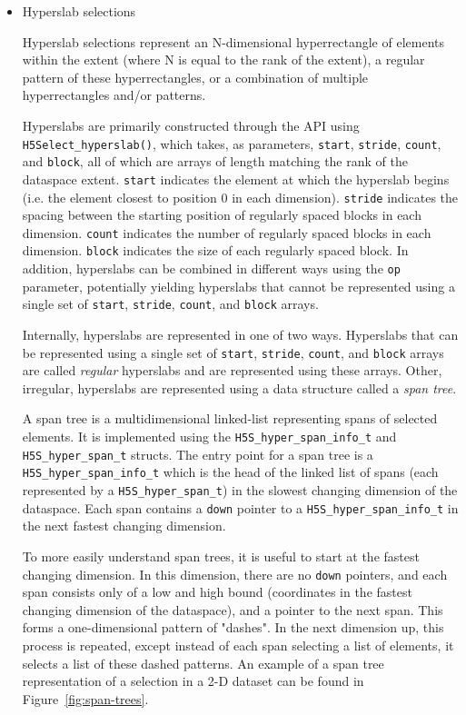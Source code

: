 \begin{itemize}
    \item Hyperslab selections

Hyperslab selections represent an N-dimensional hyperrectangle of elements within the extent (where N is equal to the rank of the extent), a regular pattern of these hyperrectangles, or a combination of multiple hyperrectangles and/or patterns.

Hyperslabs are primarily constructed through the API using \texttt{H5Select\_hyperslab()}, which takes, as parameters, \texttt{start}, \texttt{stride}, \texttt{count}, and \texttt{block}, all of which are arrays of length matching the rank of the dataspace extent. \texttt{start} indicates the element at which the hyperslab begins (i.e. the element closest to position 0 in each dimension). \texttt{stride} indicates the spacing between the starting position of regularly spaced blocks in each dimension. \texttt{count} indicates the number of regularly spaced blocks in each dimension. \texttt{block} indicates the size of each regularly spaced block. In addition, hyperslabs can be combined in different ways using the \texttt{op} parameter, potentially yielding hyperslabs that cannot be represented using a single set of \texttt{start}, \texttt{stride}, \texttt{count}, and \texttt{block} arrays.

Internally, hyperslabs are represented in one of two ways. Hyperslabs that can be represented using a single set of \texttt{start}, \texttt{stride}, \texttt{count}, and \texttt{block} arrays are called \textit{regular} hyperslabs and are represented using these arrays. Other, irregular, hyperslabs are represented using a data structure called a \textit{span tree}.

A span tree is a multidimensional linked-list representing spans of selected elements. It is implemented using the \texttt{H5S\_hyper\_span\_info\_t} and \texttt{H5S\_hyper\_span\_t} structs. The entry point for a span tree is a \texttt{H5S\_hyper\_span\_info\_t} which is the head of the linked list of spans (each represented by a \texttt{H5S\_hyper\_span\_t}) in the slowest changing dimension of the dataspace. Each span contains a \texttt{down} pointer to a \texttt{H5S\_hyper\_span\_info\_t} in the next fastest changing dimension.

To more easily understand span trees, it is useful to start at the fastest changing dimension. In this dimension, there are no \texttt{down} pointers, and each span consists only of a low and high bound (coordinates in the fastest changing dimension of the dataspace), and a pointer to the next span. This forms a one-dimensional pattern of "dashes". In the next dimension up, this process is repeated, except instead of each span selecting a list of elements, it selects a list of these dashed patterns. An example of a span tree representation of a selection in a 2-D dataset can be found in Figure~\ref{fig:span-trees}.


\end{itemize}
